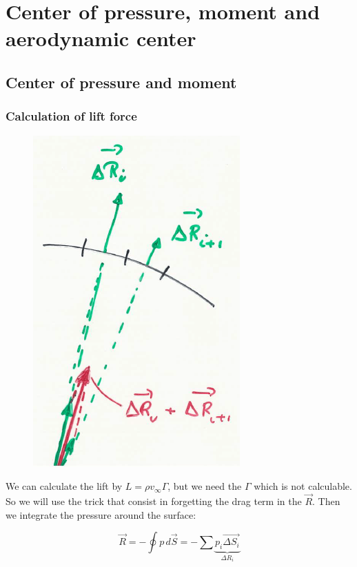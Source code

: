 		\section{Center of pressure, moment and aerodynamic center}
			\subsection{Center of pressure and moment}
				\subsubsection{Calculation of lift force}
					\begin{figure}
					\vspace{-5mm}
					\includegraphics[scale=0.3]{ch2/10}
					\end{figure}
					We can calculate the lift by $L = \rho v_\infty \Gamma$, but we need the $\Gamma$ which is not calculable. So we will use the trick that consist in forgetting the drag term in the $\vec{R}$. Then we integrate the pressure around the surface:
					
					\begin{equation}
					\vec{R} = -\oint p \, d\vec{S} = - \sum \underbrace{p_i \vec{\Delta S_i}}_{\Delta R_i}
					\end{equation}
					
